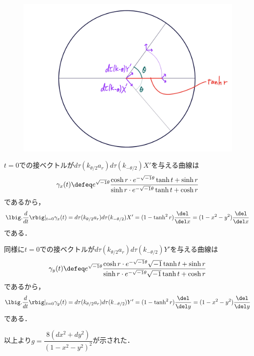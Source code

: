 \begin{npfwn}
  \begin{figure}[H]
    \centering
    \includegraphics[scale=0.08]{../graph/riem-su11.png}
    \caption{}
    \label{fig:riem-metric-su11}
  \end{figure}


  $t = 0$での接ベクトルが$d\tau(k_{\theta/2}a_r)d\tau(k_{-\theta/2})X'$を与える曲線は
  \begin{align*}
    \gamma_x(t) \defeq  e^{\sqrt{-1} \theta}\dfrac{\cosh r\cdot e^{-\sqrt{-1}\theta} \tanh t + \sinh r }{\sinh r\cdot e^{-\sqrt{-1}\theta} \tanh t + \cosh r}
  \end{align*}
  であるから，
  \begin{align*}
    \lbig.\dfrac{d}{dt}\rbig|_{t=0}\gamma_x(t) = d\tau(k_{\theta/2}a_r)d\tau(k_{-\theta/2})X' = (1 - \tanh^2 r)\dfrac{\del}{\del x} = (1-x^2-y^2)\dfrac{\del}{\del x}
  \end{align*}
  である．

  同様に$t = 0$での接ベクトルが$d\tau(k_{\theta/2}a_r)d\tau(k_{-\theta/2})Y'$を与える曲線は
  \begin{align*}
    \gamma_y(t) \defeq  e^{\sqrt{-1} \theta}\dfrac{\cosh r\cdot e^{-\sqrt{-1}\theta}\sqrt{-1} \tanh t + \sinh r }{\sinh r\cdot e^{-\sqrt{-1}\theta}\sqrt{-1} \tanh t + \cosh r}
  \end{align*}
  であるから，
  \begin{align*}
    \lbig.\dfrac{d}{dt}\rbig|_{t=0}\gamma_y(t) = d\tau(k_{\theta/2}a_r)d\tau(k_{-\theta/2})Y' = (1 - \tanh^2 r)\dfrac{\del}{\del y} = (1-x^2-y^2)\dfrac{\del}{\del y}
  \end{align*}
  である．

  以上より$g  =  \dfrac{8(dx^2 + dy^2)}{(1 - x^2 - y^2)^2} $が示された．
\end{npfwn}


